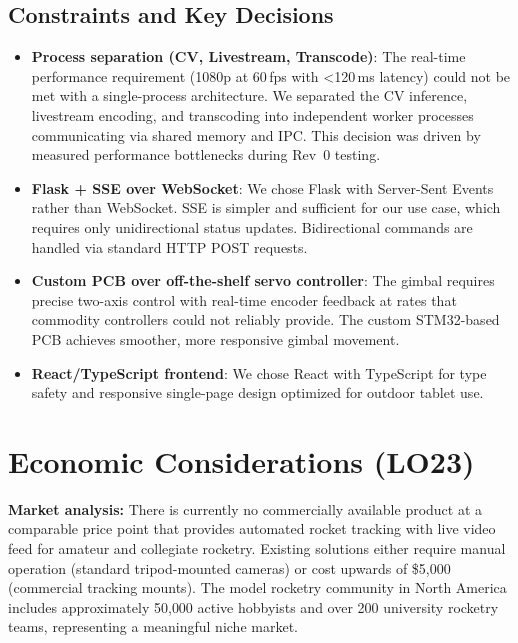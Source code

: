 \documentclass{article}
\begin{document}
\subsection*{Constraints and Key Decisions}

\begin{itemize}
  \item \textbf{Process separation (CV, Livestream, Transcode)}: The real-time
        performance requirement (1080p at 60\,fps with \textless{}120\,ms latency)
        could not be met with a single-process architecture. We separated the CV
        inference, livestream encoding, and transcoding into independent worker
        processes communicating via shared memory and IPC. This decision was driven
        by measured performance bottlenecks during Rev~0 testing.

  \item \textbf{Flask + SSE over WebSocket}: We chose Flask with Server-Sent
        Events rather than WebSocket. SSE is simpler and sufficient for our use
        case, which requires only unidirectional status updates. Bidirectional
        commands are handled via standard HTTP POST requests.

  \item \textbf{Custom PCB over off-the-shelf servo controller}: The gimbal
        requires precise two-axis control with real-time encoder feedback at rates
        that commodity controllers could not reliably provide. The custom
        STM32-based PCB achieves smoother, more responsive gimbal movement.

  \item \textbf{React/TypeScript frontend}: We chose React with TypeScript for
        type safety and responsive single-page design optimized for outdoor tablet
        use.
\end{itemize}

\section{Economic Considerations (LO23)}

\textbf{Market analysis:} There is currently no commercially available product
at a comparable price point that provides automated rocket tracking with live
video feed for amateur and collegiate rocketry. Existing solutions either
require manual operation (standard tripod-mounted cameras) or cost upwards of
\$5{,}000 (commercial tracking mounts). The model rocketry community in North
America includes approximately 50{,}000 active hobbyists and over 200 university
rocketry teams, representing a meaningful niche market.
\end{document}
